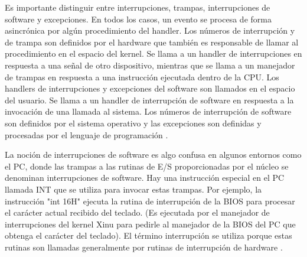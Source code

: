 \documentclass[12pt]{article}
\begin{document}
{Es importante distinguir entre interrupciones, trampas, interrupciones de software y excepciones. En todos los casos, un evento se procesa de forma asincrónica por algún procedimiento del handler. Los números de interrupción y de trampa son definidos por el hardware que también es responsable de llamar al procedimiento en el espacio del kernel. Se llama a un handler de interrupciones en respuesta a una señal de otro dispositivo, mientras que se llama a un manejador de trampas en respuesta a una instrucción ejecutada dentro de la CPU. Los handlers de interrupciones y excepciones del software son llamados en el espacio del usuario. Se llama a un handler de interrupción de software en respuesta a la invocación de una llamada al sistema. Los números de interrupción de software son definidos por el sistema operativo y las excepciones son definidas y procesadas por el lenguaje de programación \citep{Softm}.
\newline

La noción de interrupciones de software es algo confusa en algunos entornos como el PC, donde las trampas a las rutinas de E/S proporcionadas por el núcleo se denominan interrupciones de software. Hay una instrucción especial en el PC llamada INT que se utiliza para invocar estas trampas. Por ejemplo, la instrucción "int 16H" ejecuta la rutina de interrupción de la BIOS para procesar el carácter actual recibido del teclado. (Es ejecutada por el manejador de interrupciones del kernel Xinu para pedirle al manejador de la BIOS del PC que obtenga el carácter del teclado). El término interrupción se utiliza porque estas rutinas son llamadas generalmente por rutinas de interrupción de hardware \citep{Softm}.


\medskip

 



}
\end{document}
